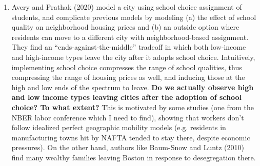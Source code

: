 \documentclass[JEL]{AEA}
\begin{document}
\begin{enumerate}
    \item Avery and Prathak (2020) model a city using school choice assignment of students, and complicate previous models by modeling (a) the effect of school quality on neighborhood housing prices and (b) an outside option where residents can move to a different city with neighborhood-based assignment. They find an “ends-against-the-middle” tradeoff in which both low-income and high-income types leave the city after it adopts school choice. Intuitively, implementing school choice compresses the range of school qualities, thus compressing the range of housing prices as well, and inducing those at the high and low ends of the spectrum to leave. \textbf{Do we actually observe high and low income types leaving cities after the adoption of school choice? To what extent?} This is motivated by some studies (one from the NBER labor conference which I need to find), showing that workers don’t follow idealized perfect geographic mobility models (e.g. residents in manufacturing towns hit by NAFTA tended to stay there, despite economic pressures). On the other hand, authors like Baum-Snow and Luntz (2010) find many wealthy families leaving Boston in response to desegregation there.

    
\end{enumerate}




\end{document}
